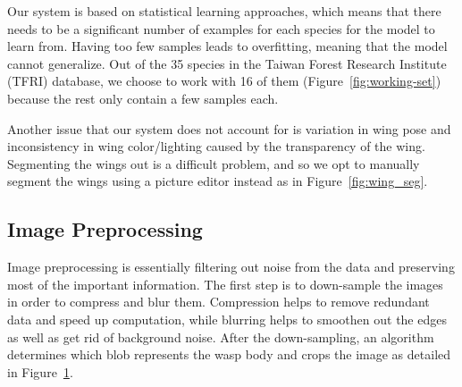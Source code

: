 \documentclass[a4paper,12pt]{article}
\begin{document}
Our system is based on statistical learning approaches, which means that there needs to be a significant number of examples for each species for the model to learn from. Having too few samples leads to overfitting, meaning that the model cannot generalize. Out of the 35 species in the Taiwan Forest Research Institute (TFRI) database, we choose to work with 16 of them (Figure~\ref{fig:working-set}) because the rest only contain a few samples each. 

Another issue that our system does not account for is variation in wing pose and inconsistency in wing color/lighting caused by the transparency of the wing. Segmenting the wings out is a difficult problem, and so we opt to manually segment the wings using a picture editor instead as in Figure~\ref{fig:wing_seg}.

\subsection{Image Preprocessing}
Image preprocessing is essentially filtering out noise from the data and preserving most of the important information. The first step is to down-sample the images in order to compress and blur them. Compression helps to  remove redundant data and speed up computation, while blurring helps to smoothen out the edges as well as get rid of background noise. After the down-sampling, an algorithm determines which blob represents the wasp body and crops the image as detailed in Figure~\ref{fig:preprocessing}.

\begin{figure}[t]
	\centering
	 \hfill
	 \hfill
	 \hfill
	\caption{}
	\label{fig:preprocessing}
\end{figure}
\end{document}
